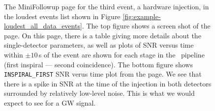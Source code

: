 \begin{figure}[p]
\center
{}
\label{fig:sample-minifup_hardware_inj}
\caption{The MiniFollowup page for the third event, a hardware injection, in
the loudest events list shown in Figure
\ref{fig:example-loudest_all_data_events}. The top figure shows a screen shot
of the page. On this page, there is a table giving more details about the
single-detector parameters, as well as plots of SNR versus time within $\pm
10\,$s of the event are shown for each stage in the \hipe~pipeline (first
inspiral --- second coincidence). The bottom figure shows
\texttt{INSPIRAL\_FIRST} SNR verus time plot from the page. We see that there
is a spike in SNR at the time of the injection in both detectors surrounded by
relatively low-level noise. This is what we would expect to see for a \ac{GW}
signal.}
\end{figure}

